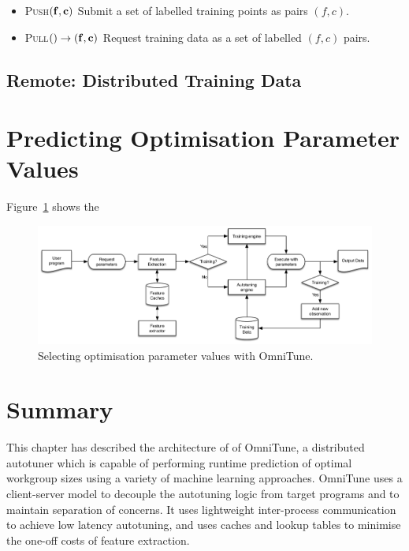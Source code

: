 \begin{itemize}
\item \textsc{Push}$(\bf{f}, \bf{c})$ Submit a set of labelled training
  points as pairs $(f,c)$.
\item \textsc{Pull}$() \to (\bf{f}, \bf{c})$ Request training data as a
  set of labelled $(f,c)$ pairs.
\end{itemize}


\subsection{Remote: Distributed Training Data}

\TODO{\ldots}


\section{Predicting Optimisation Parameter Values}

Figure~\ref{fig:omnitune-system-flow} shows the \TODO{\ldots}




\begin{figure}
\centering
\includegraphics[width=\textwidth]{img/omnitune-system-flow.pdf}
\caption{%
  Selecting optimisation parameter values with OmniTune.%
}
\label{fig:omnitune-system-flow}
\end{figure}


\section{Summary}

This chapter has described the architecture of of OmniTune, a
distributed autotuner which is capable of performing runtime
prediction of optimal workgroup sizes using a variety of machine
learning approaches. OmniTune uses a client-server model to decouple
the autotuning logic from target programs and to maintain separation
of concerns. It uses lightweight inter-process communication to
achieve low latency autotuning, and uses caches and lookup tables to
minimise the one-off costs of feature extraction.
